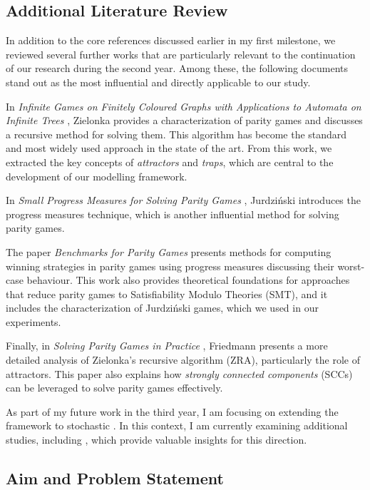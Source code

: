 \documentclass{article}
\begin{document}
\subsection{Additional Literature Review}

In addition to the core references discussed earlier in my first milestone, we reviewed several further works that are particularly relevant to the continuation of our research during the second year. Among these, the following documents stand out as the most influential and directly applicable to our study.

In \emph{Infinite Games on Finitely Coloured Graphs with Applications to Automata on Infinite Trees} \cite{Zielonka:1998}, Zielonka provides a characterization of parity games and discusses a recursive method for solving them. This algorithm has become the standard and most widely used approach in the state of the art. From this work, we extracted the key concepts of \emph{attractors} and \emph{traps}, which are central to the development of our modelling framework.

In \emph{Small Progress Measures for Solving Parity Games} \cite{Jurdziński:2000}, Jurdziński introduces the progress measures technique, which is another influential method for solving parity games.  

The paper \emph{Benchmarks for Parity Games} \cite{Keiren:2015} presents methods for computing winning strategies in parity games using progress measures discussing their worst-case behaviour. This work also provides theoretical foundations for approaches that reduce parity games to Satisfiability Modulo Theories (SMT), and it includes the characterization of Jurdziński games, which we used in our experiments.  

Finally, in \emph{Solving Parity Games in Practice} \cite{Friedmann:2009}, Friedmann presents a more detailed analysis of Zielonka’s recursive algorithm (ZRA), particularly the role of attractors. This paper also explains how \emph{strongly connected components} (SCCs) can be leveraged to solve parity games effectively.

As part of my future work in the third year, I am focusing on extending the framework to stochastic \wregulargames. In this context, I am currently examining additional studies, including \cite{Chatterjee:2012,Gladin:2022,Rendl:2014,Tarim:2006,Walsh:2009}, which provide valuable insights for this direction.

\subsection{Aim and Problem Statement}
\end{document}
